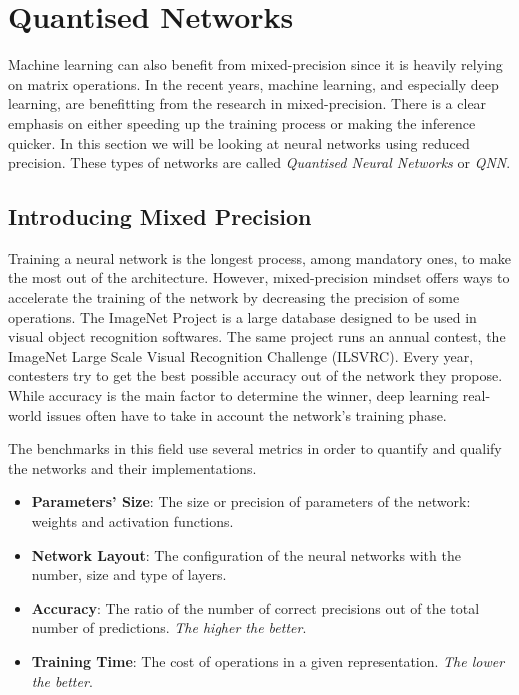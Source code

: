 \section{Quantised Networks}

Machine learning can also benefit from mixed-precision since it is heavily relying on matrix operations. In the recent years, machine learning, and especially deep learning, are benefitting from the research in mixed-precision. There is a clear emphasis on either speeding up the training process or making the inference quicker. In this section we will be looking at neural networks using reduced precision. These types of networks are called \emph{Quantised Neural Networks} or \emph{QNN}.


\subsection{Introducing Mixed Precision}

Training a neural network is the longest process, among mandatory ones, to make the most out of the architecture. However, mixed-precision mindset offers ways to accelerate the training of the network by decreasing the precision of some operations. The ImageNet Project \cite{ImageNet2009} is a large database designed to be used in visual object recognition softwares. The same project runs an annual contest, the ImageNet Large Scale Visual Recognition Challenge (ILSVRC). Every year, contesters try to get the best possible accuracy out of the network they propose. While accuracy is the main factor to determine the winner, deep learning real-world issues often have to take in account the network's training phase.

The benchmarks in this field use several metrics in order to quantify and qualify the networks and their implementations.
\begin{itemize}
	\item \textbf{Parameters' Size}: The size or precision of parameters of the network: weights and activation functions.
	\item \textbf{Network Layout}: The configuration of the neural networks with the number, size and type of layers.
	\item \textbf{Accuracy}: The ratio of the number of correct precisions out of the total number of predictions. \emph{The higher the better}.
	\item \textbf{Training Time}: The cost of operations in a given representation. \emph{The lower the better}.
\end{itemize}

